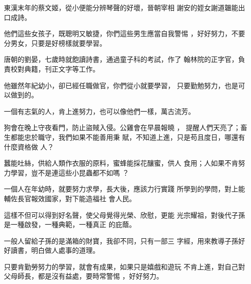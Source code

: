 \documentclass[avery5371,grid]{flashcards}
\begin{document}
{東漢末年的蔡文姬，從小便能分辨琴聲的好壞，晉朝宰相
謝安的姪女謝道韞能出口成詩。} %
{} %

{他們這些女孩子，既聰明又敏捷，你們這些男生應當自我警惕
，好好努力，不要分男女，只要是好榜樣就要學習。} %
{} %

{唐朝的劉晏，七歲時就飽讀詩書，通過童子科的考試，作了
翰林院的正字官，負責校對典籍，刊正文字等工作。} %
{} %

{他雖然年紀幼小，卻已經任職做官，你們從小就要學習，
只要勤勉努力，也是可以做到的。} %
{} %

{一個有志氣的人，肯上進努力，也可以像他們一樣，萬古流芳。} %
{} %






{狗會在晚上守夜看門，防止盜賊入侵。公雞會在早晨報曉 ，
提醒人們天亮了；畜生都能忠於職守，我們如果不能善用秉
賦，不知道上進，只是苟且度日，哪還有什麼資格做 人？} %
{} %

{蠶能吐絲，供給人類作衣服的原料，蜜蜂能採花釀蜜，供人
食用；人如果不肯努力學習，豈不是連這些小昆蟲都不如嗎
？} %
{} %

{一個人在年幼時，就要努力求學，長大後，應該力行實踐
所學到的學問，對上能輔佐長官報效國家，對下能造福社
會人民。} %
{} %

{這樣不但可以得到好名聲，使父母覺得光榮、欣慰，更能
光宗耀祖，對後代子孫是一種啟發，一種典範，一種真正
的庇蔭。} %
{} %

{一般人留給子孫的是滿箱的財寶，我卻不同，只有一部三
字經，用來教導子孫好好讀書，明白做人處事的道理。} %
{} %

{只要肯勤勞努力的學習，就會有成果，如果只是嬉戲和遊玩
不肯上進，對自己對父母師長，都是沒有益處，要時常警惕
，好好努力。} %
{} %
\end{document}
